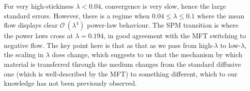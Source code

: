 \documentclass[
reprint,
 amsmath,amssymb,
 aps,
 prl
]{revtex4-1}
\begin{document}
For very high-stickiness $\lambda<0.04$, convergence is very slow, hence
the large standard errors. However, there is a regime when $0.04 \le
\lambda \le 0.1$ where the mean flow displays clear $\mathcal{O}~(\lambda^{4})$ power-law behaviour.  The SPM
transition is where the power laws cross at $\lambda =
0.194$, in good agreement with the MFT switching to negative flow.
The key point here is that as that as we pass from high-$\lambda$ to
low-$\lambda$, the scaling in $\lambda$ does change, which suggests to
us that the mechanism by which material is transferred through the
medium changes from the standard diffusive one (which is
well-described by the MFT) to something different, which to our
knowledge has not been previously observed.
\end{document}
